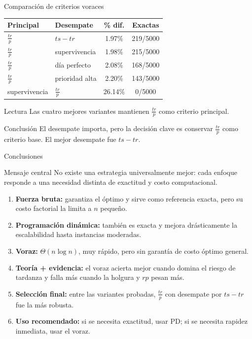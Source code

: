\documentclass[aspectratio=169]{beamer}
\begin{document}
\begin{frame}{Comparaci\'on de criterios voraces}
  \scriptsize
  \begin{table}
    \centering
    \begin{tabular}{@{}l l c c@{}}
      \toprule
      Principal & Desempate & \% dif. & Exactas \\
      \midrule
      \(\frac{tr}{p}\) & \(ts-tr\) & 1.97\% & 219/5000 \\
      \(\frac{tr}{p}\) & supervivencia & 1.98\% & 215/5000 \\
      \(\frac{tr}{p}\) & d\'ia perfecto & 2.08\% & 168/5000 \\
      \(\frac{tr}{p}\) & prioridad alta & 2.20\% & 143/5000 \\
      supervivencia & \(\frac{tr}{p}\) & 26.14\% & 0/5000 \\
      \bottomrule
    \end{tabular}
  \end{table}

  \vspace{0.2em}
  \begin{block}{Lectura}
    Las cuatro mejores variantes mantienen \(\frac{tr}{p}\) como criterio principal.
  \end{block}

  \begin{alertblock}{Conclusi\'on}
    El desempate importa, pero la decisi\'on clave es conservar \(\frac{tr}{p}\) como criterio base. El mejor desempate fue \(ts-tr\).
  \end{alertblock}
\end{frame}

\begin{frame}{Conclusiones}
  \small
  \begin{block}{Mensaje central}
    No existe una estrategia universalmente mejor: cada enfoque responde a una necesidad distinta de exactitud y costo computacional.
  \end{block}

  \begin{enumerate}
    \item \textbf{Fuerza bruta:} garantiza el \'optimo y sirve como referencia exacta, pero su costo factorial la limita a \(n\) peque\~no.
    \item \textbf{Programaci\'on din\'amica:} tambi\'en es exacta y mejora dr\'asticamente la escalabilidad hasta instancias moderadas.
    \item \textbf{Voraz:} \(\Theta(n\log n)\), muy r\'apido, pero sin garant\'ia de costo \'optimo general.
    \item \textbf{Teor\'ia + evidencia:} el voraz acierta mejor cuando domina el riesgo de tardanza y falla m\'as cuando la holgura y \(rp\) pesan m\'as.
    \item \textbf{Selecci\'on final:} entre las variantes probadas, \(\frac{tr}{p}\) con desempate por \(ts-tr\) fue la m\'as robusta.
    \item \textbf{Uso recomendado:} si se necesita exactitud, usar PD; si se necesita rapidez inmediata, usar el voraz.
  \end{enumerate}
\end{frame}
\end{document}
